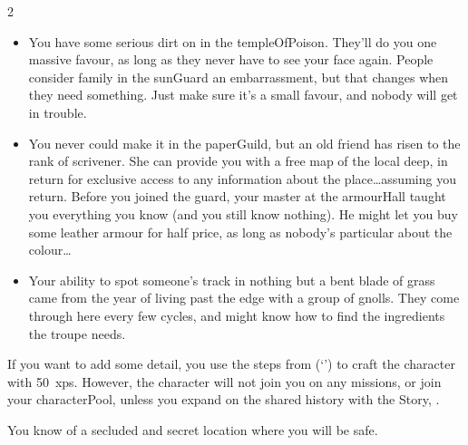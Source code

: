 \begin{multicols}{2}
\begin{exampletext}
  \begin{itemize}
    \item\ifodd\thecycle%
      You have some serious dirt on  in the \gls{templeOfPoison}.
      They'll do you one massive favour, as long as they never have to see your face again.
    \else%
      People consider family in the \gls{sunGuard} an embarrassment, but that changes when they need something.
      Just make sure it's a small favour, and nobody will get in trouble.
    \fi
    \item\ifodd\thecycle%
      You never could make it in the \gls{paperGuild}, but an old friend has risen to the rank of \gls{scrivener}.
      She can provide you with a free map of the local \gls{deep}, in return for exclusive access to any information about the place\ldots assuming you return.
    \else%
      Before you joined the \gls{guard}, your master at the \gls{armourHall} taught you everything you know (and you still know nothing).
      He might let you buy some leather armour for half price, as long as nobody's particular about the colour\ldots
    \fi
    \item
    Your ability to spot someone's track in nothing but a bent blade of grass came from the year of living past the \gls{edge} with a group of gnolls.
    They come through here every few \glspl{cycle}, and might know how to find the \glspl{ingredient} the troupe needs.
  \end{itemize}
\end{exampletext}

If you want to add some detail, you use the steps from  (`') to craft the character with 50~\glspl{xp}.
However, the character will not join you on any missions, or join your \gls{characterPool}, unless you expand on the shared history with the  Story, .

You know of a secluded and secret location where you will be safe.


\end{multicols}

